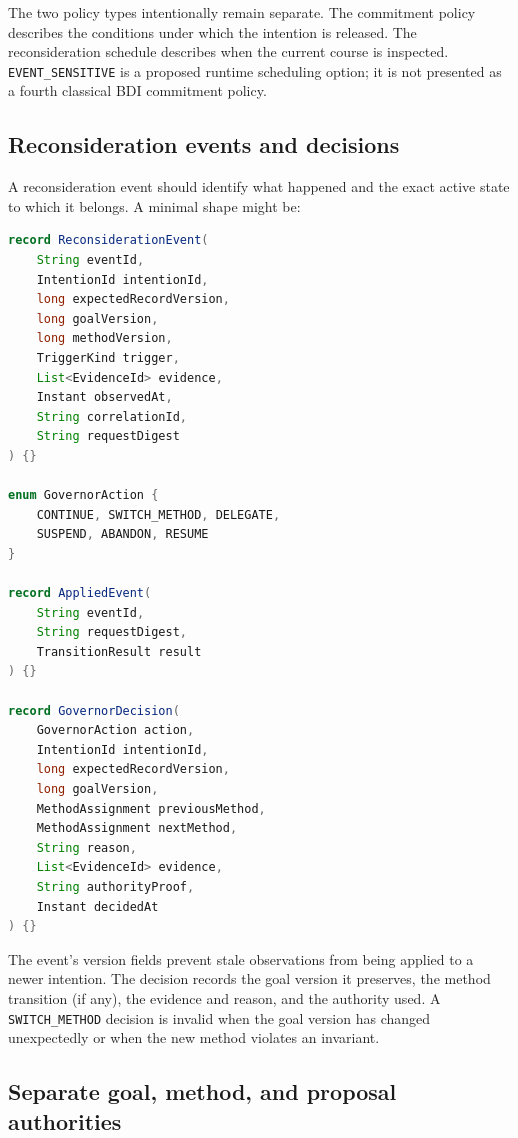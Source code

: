 The two policy types intentionally remain separate. The commitment policy describes the conditions under which the intention is released. The reconsideration schedule describes when the current course is inspected. \texttt{EVENT\_SENSITIVE} is a proposed runtime scheduling option; it is not presented as a fourth classical BDI commitment policy.

\subsection{Reconsideration events and decisions}

A reconsideration event should identify what happened and the exact active state to which it belongs. A minimal shape might be:

\begin{lstlisting}[language=Java,caption={Version-bound reconsideration event and governor decision},label={lst:ch15-decision-contract}]
record ReconsiderationEvent(
    String eventId,
    IntentionId intentionId,
    long expectedRecordVersion,
    long goalVersion,
    long methodVersion,
    TriggerKind trigger,
    List<EvidenceId> evidence,
    Instant observedAt,
    String correlationId,
    String requestDigest
) {}

enum GovernorAction {
    CONTINUE, SWITCH_METHOD, DELEGATE,
    SUSPEND, ABANDON, RESUME
}

record AppliedEvent(
    String eventId,
    String requestDigest,
    TransitionResult result
) {}

record GovernorDecision(
    GovernorAction action,
    IntentionId intentionId,
    long expectedRecordVersion,
    long goalVersion,
    MethodAssignment previousMethod,
    MethodAssignment nextMethod,
    String reason,
    List<EvidenceId> evidence,
    String authorityProof,
    Instant decidedAt
) {}
\end{lstlisting}

The event's version fields prevent stale observations from being applied to a newer intention. The decision records the goal version it preserves, the method transition (if any), the evidence and reason, and the authority used. A \texttt{SWITCH\_METHOD} decision is invalid when the goal version has changed unexpectedly or when the new method violates an invariant.

\subsection{Separate goal, method, and proposal authorities}

